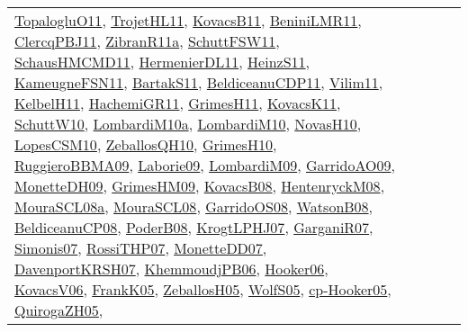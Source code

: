 {\begin{longtable}{lp{3cm}>{\raggedright}p{6cm}>{\raggedright}p{6cm}p{8cm}}
\href{articles/TopalogluO11.pdf}{TopalogluO11}\cite{TopalogluO11}, \href{articles/TrojetHL11.pdf}{TrojetHL11}\cite{TrojetHL11}, \href{articles/KovacsB11.pdf}{KovacsB11}\cite{KovacsB11}, \href{articles/BeniniLMR11.pdf}{BeniniLMR11}\cite{BeniniLMR11}, \href{papers/ClercqPBJ11.pdf}{ClercqPBJ11}\cite{ClercqPBJ11}, \href{papers/ZibranR11a.pdf}{ZibranR11a}\cite{ZibranR11a}, \href{articles/SchuttFSW11.pdf}{SchuttFSW11}\cite{SchuttFSW11}, \href{articles/SchausHMCMD11.pdf}{SchausHMCMD11}\cite{SchausHMCMD11}, \href{papers/HermenierDL11.pdf}{HermenierDL11}\cite{HermenierDL11}, \href{papers/HeinzS11.pdf}{HeinzS11}\cite{HeinzS11}, \href{papers/KameugneFSN11.pdf}{KameugneFSN11}\cite{KameugneFSN11}, \href{articles/BartakS11.pdf}{BartakS11}\cite{BartakS11}, \href{articles/BeldiceanuCDP11.pdf}{BeldiceanuCDP11}\cite{BeldiceanuCDP11}, \href{papers/Vilim11.pdf}{Vilim11}\cite{Vilim11}, \href{articles/KelbelH11.pdf}{KelbelH11}\cite{KelbelH11}, \href{articles/HachemiGR11.pdf}{HachemiGR11}\cite{HachemiGR11}, \href{papers/GrimesH11.pdf}{GrimesH11}\cite{GrimesH11}, \href{articles/KovacsK11.pdf}{KovacsK11}\cite{KovacsK11}, \href{papers/SchuttW10.pdf}{SchuttW10}\cite{SchuttW10}, \href{articles/LombardiM10a.pdf}{LombardiM10a}\cite{LombardiM10a}, \href{papers/LombardiM10.pdf}{LombardiM10}\cite{LombardiM10}, \href{articles/NovasH10.pdf}{NovasH10}\cite{NovasH10}, \href{articles/LopesCSM10.pdf}{LopesCSM10}\cite{LopesCSM10}, \href{articles/ZeballosQH10.pdf}{ZeballosQH10}\cite{ZeballosQH10}, \href{papers/GrimesH10.pdf}{GrimesH10}\cite{GrimesH10}, \href{articles/RuggieroBBMA09.pdf}{RuggieroBBMA09}\cite{RuggieroBBMA09}, \href{papers/Laborie09.pdf}{Laborie09}\cite{Laborie09}, \href{papers/LombardiM09.pdf}{LombardiM09}\cite{LombardiM09}, \href{articles/GarridoAO09.pdf}{GarridoAO09}\cite{GarridoAO09}, \href{papers/MonetteDH09.pdf}{MonetteDH09}\cite{MonetteDH09}, \href{papers/GrimesHM09.pdf}{GrimesHM09}\cite{GrimesHM09}, \href{articles/KovacsB08.pdf}{KovacsB08}\cite{KovacsB08}, \href{papers/HentenryckM08.pdf}{HentenryckM08}\cite{HentenryckM08}, \href{papers/MouraSCL08a.pdf}{MouraSCL08a}\cite{MouraSCL08a}, \href{papers/MouraSCL08.pdf}{MouraSCL08}\cite{MouraSCL08}, \href{articles/GarridoOS08.pdf}{GarridoOS08}\cite{GarridoOS08}, \href{papers/WatsonB08.pdf}{WatsonB08}\cite{WatsonB08}, \href{papers/BeldiceanuCP08.pdf}{BeldiceanuCP08}\cite{BeldiceanuCP08}, \href{papers/PoderB08.pdf}{PoderB08}\cite{PoderB08}, \href{papers/KrogtLPHJ07.pdf}{KrogtLPHJ07}\cite{KrogtLPHJ07}, \href{papers/GarganiR07.pdf}{GarganiR07}\cite{GarganiR07}, \href{articles/Simonis07.pdf}{Simonis07}\cite{Simonis07}, \href{papers/RossiTHP07.pdf}{RossiTHP07}\cite{RossiTHP07}, \href{papers/MonetteDD07.pdf}{MonetteDD07}\cite{MonetteDD07}, \href{papers/DavenportKRSH07.pdf}{DavenportKRSH07}\cite{DavenportKRSH07}, \href{papers/KhemmoudjPB06.pdf}{KhemmoudjPB06}\cite{KhemmoudjPB06}, \href{articles/Hooker06.pdf}{Hooker06}\cite{Hooker06}, \href{papers/KovacsV06.pdf}{KovacsV06}\cite{KovacsV06}, \href{papers/FrankK05.pdf}{FrankK05}\cite{FrankK05}, \href{articles/ZeballosH05.pdf}{ZeballosH05}\cite{ZeballosH05}, \href{papers/WolfS05.pdf}{WolfS05}\cite{WolfS05}, \href{papers/cp-Hooker05.pdf}{cp-Hooker05}\cite{cp-Hooker05}, \href{papers/QuirogaZH05.pdf}{QuirogaZH05}\cite{QuirogaZH05}, 
\end{longtable}}

